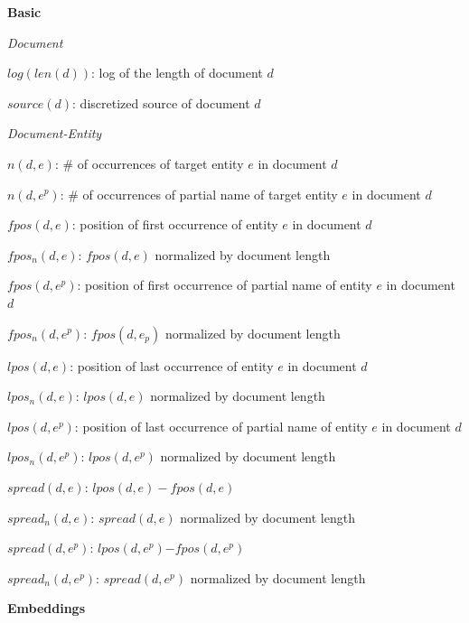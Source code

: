 \documentclass{article}
\begin{document}
\begin{itemize*}
  \item \textbf{Basic}
    \begin{itemize*}
      \item \textit{Document}
        \begin{itemize*}
            \item $log(len(d))$: log of the length of document $d$
            \item $source(d)$: discretized source of document $d$
        \end{itemize*}
      \item \textit{Document-Entity}
        \begin{itemize*}
            \item $n(d,e)$: \# of occurrences of target entity $e$ in document $d$
            \item $n(d,e^p)$: \# of occurrences of partial name of target entity $e$ in document $d$
            \item $fpos(d,e)$: position of first occurrence of entity $e$ in document $d$
            \item $fpos_n(d,e)$: $fpos(d,e)$ normalized by document length
            \item $fpos(d,e^p)$: position of first occurrence of partial name of entity $e$ in document $d$
            \item $fpos_n(d,e^p)$: $fpos(d,e_p)$ normalized by document length
            \item $lpos(d,e)$: position of last occurrence of entity $e$ in document $d$
            \item $lpos_n(d,e)$: $lpos(d,e)$ normalized by document length
            \item $lpos(d,e^p)$: position of last occurrence of partial name of entity $e$ in document $d$
            \item $lpos_n(d,e^p)$: $lpos(d,e^p)$ normalized by document length
            \item $spread(d,e)$: $lpos(d,e) - fpos(d,e)$
            \item $spread_n(d,e)$: $spread(d,e)$ normalized by document length
            \item $spread(d,e^p)$: $lpos(d,e^p)\mathord{-}fpos(d,e^p)$
            \item $spread_n(d,e^p)$: $spread(d,e^p)$ normalized by document length
        \end{itemize*}
    \end{itemize*}
  \item \textbf{Embeddings}

\end{itemize*}
\end{document}
